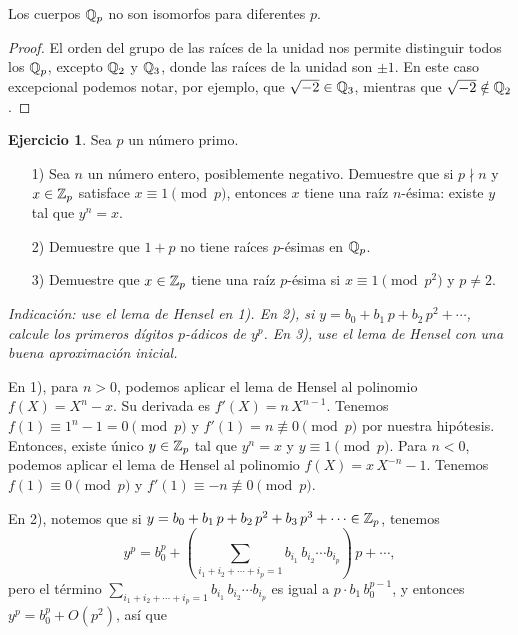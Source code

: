 \documentclass{article}
\numberwithin{equation}{section}
\theoremstyle{definition}
\newtheorem{ejerc}{Ejercicio}
\newif\ifsolutions
\begin{document}
\begin{corolario}
  Los cuerpos $\mathbb{Q}_p$ no son isomorfos para diferentes $p$.

  \begin{proof}
    El orden del grupo de las raíces de la unidad nos permite distinguir todos
    los $\mathbb{Q}_p$, excepto $\mathbb{Q}_2$ y $\mathbb{Q}_3$, donde las raíces de la unidad son
    $\pm 1$. En este caso excepcional podemos notar, por ejemplo, que
    $\sqrt{-2} \in \mathbb{Q}_3$, mientras que $\sqrt{-2} \notin \mathbb{Q}_2$.
  \end{proof}
\end{corolario}

\begin{ejerc}
  Sea $p$ un número primo.

  \begin{enumerate}
  \item[1)] Sea $n$ un número entero, posiblemente negativo. Demuestre que si
    $p\nmid n$ y $x\in\mathbb{Z}_p$ satisface $x\equiv 1\pmod{p}$, entonces $x$ tiene
    una raíz $n$-ésima: existe $y$ tal que $y^n = x$.

  \item[2)] Demuestre que $1 + p$ no tiene raíces $p$-ésimas en $\mathbb{Q}_p$.

  \item[3)] Demuestre que $x\in\mathbb{Z}_p$ tiene una raíz $p$-ésima si
    $x \equiv 1 \pmod{p^2}$ y $p \ne 2$.
  \end{enumerate}

  \noindent \emph{Indicación: use el lema de Hensel en 1). En 2), si
    $y = b_0 + b_1\,p + b_2\,p^2 + \cdots$, calcule los primeros dígitos
    $p$-ádicos de $y^p$. En 3), use el lema de Hensel con una buena aproximación
    inicial.}

  \ifsolutions\begin{solucion}
    En 1), para $n > 0$, podemos aplicar el lema de Hensel al polinomio
    $f (X) = X^n - x$. Su derivada es $f' (X) = n\,X^{n-1}$. Tenemos
    $f (1) \equiv 1^n - 1 = 0 \pmod{p}$ y $f' (1) = n \not\equiv 0 \pmod{p}$ por
    nuestra hipótesis. Entonces, existe único $y\in\mathbb{Z}_p$ tal que $y^n = x$ y
    $y\equiv 1\pmod{p}$. Para $n < 0$, podemos aplicar el lema de Hensel
    al polinomio $f (X) = x\,X^{-n} - 1$. Tenemos $f (1) \equiv 0 \pmod{p}$ y
    $f' (1) \equiv -n \not\equiv 0 \pmod{p}$.

    En 2), notemos que si
    $y = b_0 + b_1\,p + b_2\,p^2 + b_3\,p^3 + \cdots\in\mathbb{Z}_p$, tenemos
    $$y^p = b_0^p + \left(\sum_{i_1 + i_2 + \cdots + i_p = 1} b_{i_1} \, b_{i_2} \cdots b_{i_p}\right)\,p + \cdots,$$
    pero el término
    $\sum\limits_{i_1 + i_2 + \cdots + i_p = 1} b_{i_1}\,b_{i_2}\cdots b_{i_p}$
    es igual a $p\cdot b_1\,b_0^{p-1}$, y entonces
    $y^p = b_0^p + O (p^2)$, así que


\end{solucion}
\end{ejerc}
\end{document}
